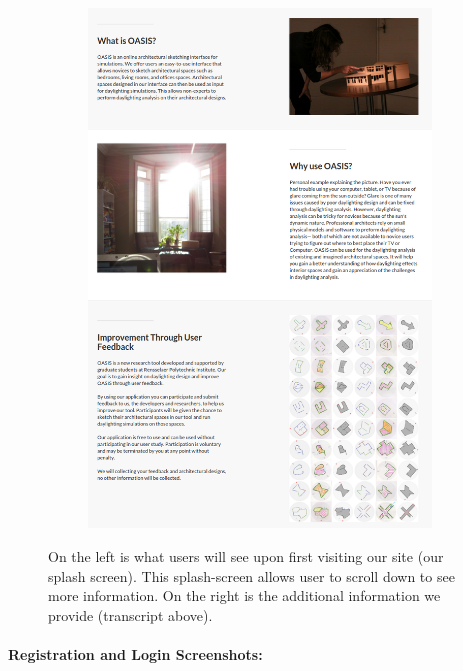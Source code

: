 \documentclass[12pt]{article}
\begin{document}
\begin{figure}[h]
\begin{subfigure}{.5\textwidth}
    \includegraphics[scale=0.3]{big_img}
  \end{subfigure}

\caption{On the left is what users will see upon first visiting our site (our splash screen). This splash-screen allows user to scroll down to see more information.  On the right is the additional information we provide (transcript above).}  
\label{fig:splash}
\end{figure}
\newpage


\paragraph{Registration and Login Screenshots:}
\end{document}
